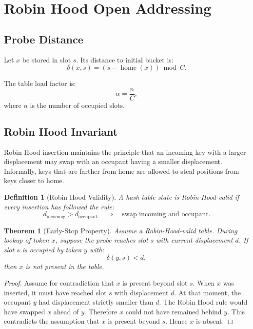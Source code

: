 \documentclass[11pt,a4paper]{article}
\newtheorem{definition}{Definition}
\newtheorem{theorem}{Theorem}
\newcommand{\home}{\operatorname{home}}
\begin{document}
\section{Robin Hood Open Addressing}

\subsection{Probe Distance}

Let \(x\) be stored in slot \(s\). Its distance to initial bucket is:
\[
\delta(x,s)=(s-\home(x))\bmod C.
\]

The table load factor is:
\[
\alpha=\frac{n}{C},
\]
where \(n\) is the number of occupied slots.

\subsection{Robin Hood Invariant}

Robin Hood insertion maintains the principle that an incoming key with a larger displacement may swap with an occupant having a smaller displacement. Informally, keys that are farther from home are allowed to steal positions from keys closer to home.

\begin{definition}[Robin Hood Validity]
A hash table state is Robin-Hood-valid if every insertion has followed the rule:
\[
d_{\text{incoming}}>d_{\text{occupant}}
\quad\Rightarrow\quad
\text{swap incoming and occupant}.
\]
\end{definition}

\begin{theorem}[Early-Stop Property]
Assume a Robin-Hood-valid table. During lookup of token \(x\), suppose the probe reaches slot \(s\) with current displacement \(d\). If slot \(s\) is occupied by token \(y\) with:
\[
\delta(y,s)<d,
\]
then \(x\) is not present in the table.
\end{theorem}

\begin{proof}
Assume for contradiction that \(x\) is present beyond slot \(s\). When \(x\) was inserted, it must have reached slot \(s\) with displacement \(d\). At that moment, the occupant \(y\) had displacement strictly smaller than \(d\). The Robin Hood rule would have swapped \(x\) ahead of \(y\). Therefore \(x\) could not have remained behind \(y\). This contradicts the assumption that \(x\) is present beyond \(s\). Hence \(x\) is absent.
\end{proof}
\end{document}
